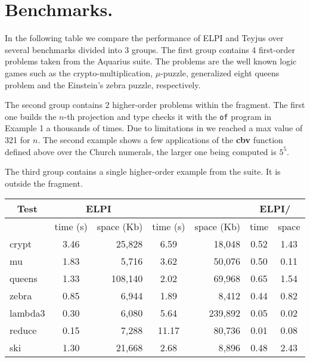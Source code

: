 \documentclass{llncs}
\begin{document}
\section{Benchmarks.}\label{sec:benchmarks}

In the following table we compare the performance of ELPI and Teyjus over
several benchmarks divided into 3 groups.  The first group contains 4
first-order problems taken from the Aquarius suite. The problems are the well
known logic games such as the crypto-multiplication, $\mu$-puzzle,
generalized eight queens problem and the Einstein's zebra puzzle,
respectively.

The second group contains 2 higher-order problems within the fragment. The
first one builds the $n$-th projection and type checks it with the \verb+of+
program in Example 1 a thousands of times.
Due to limitations in \tedius{} we reached a max
value of 321 for $n$.
The second
example shows a few applications of the {\bf cbv} function defined above over
the Church numerals, the larger one being computed is $5^5$.

The third group contains a single higher-order example from the \tedius{}
suite.  It is outside the fragment. 

\begin{center}

  \begin{tabular}{|p{1.5cm}||c|r||c|r||c|c|}
    \hline
      \multicolumn{1}{|c||}{Test} &
      \multicolumn{2}{|c||}{ELPI} &
      \multicolumn{2}{|c||}{\tedius{}} &
    \multicolumn{2}{|c|}{ELPI/\tedius{}} \\
    \hline
    &  time (s)     & space (Kb)  & time (s) & space (Kb) &  time & space \\
    
    \hline
    \hline
    crypt &  3.46 & 25,828  & 6.59 & 18,048 &  0.52 & 1.43 \\
    \hline    
    mu &  1.83 & 5,716 &  3.62 & 50,076 &  0.50 & 0.11 \\
    \hline
    queens &  1.33  & 108,140 &  2.02 & 69,968 &  0.65 & 1.54 \\
    \hline    
    zebra &  0.85 & 6,944 &  1.89 & 8,412 &  0.44 & 0.82 \\
    \hline     
    \hline
    lambda3 &  0.30 & 6,080 &  5.64 & 239,892 &  0.05 & 0.02 \\
    \hline
    reduce &  0.15 & 7,288 &   11.17 & 80,736  & 0.01 & 0.08 \\
    \hline
    \hline
    ski &  1.30 & 21,668 &  2.68 & 8,896  & 0.48 & 2.43 \\
    \hline
    
  \end{tabular}

 \end{center}


 


\end{document}
